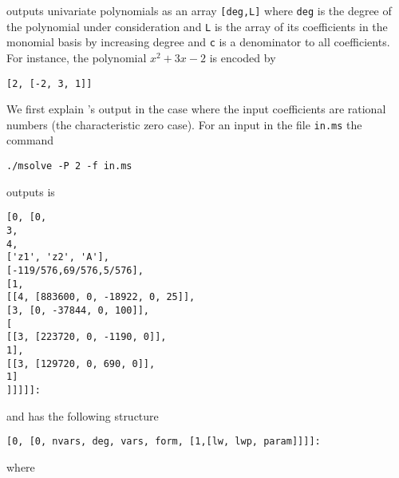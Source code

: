 \documentclass[a4paper,english,11pt]{scrartcl}
\theoremstyle{definition}
\theoremstyle{remark}
\begin{document}
\msolve outputs univariate polynomials as an array \verb+[deg,L]+ where
\verb+deg+ is the degree of the polynomial under consideration and \verb+L+ is
the array of its coefficients in the monomial basis by increasing degree and 
\verb+c+ is a denominator to all coefficients. For instance, the polynomial 
\(x^2+3x-2\) is encoded by 
\begin{verbatim}
[2, [-2, 3, 1]]
\end{verbatim}


We first explain \msolve's output in the case where the input coefficients are 
rational numbers (the characteristic zero case).
For an input in the file \verb+in.ms+
the command
\begin{tcolorbox} %
  \begin{verbatim}
./msolve -P 2 -f in.ms
  \end{verbatim}
\end{tcolorbox}
\msolve outputs is
\begin{tcolorbox} %
  \begin{lstlisting}
[0, [0, 
3, 
4, 
['z1', 'z2', 'A'],
[-119/576,69/576,5/576],
[1,
[[4, [883600, 0, -18922, 0, 25]],
[3, [0, -37844, 0, 100]],
[
[[3, [223720, 0, -1190, 0]],
1],
[[3, [129720, 0, 690, 0]],
1]
]]]]]:
  \end{lstlisting}
\end{tcolorbox}
and
has the following structure
\begin{tcolorbox}
  \begin{lstlisting}
[0, [0, nvars, deg, vars, form, [1,[lw, lwp, param]]]]:
  \end{lstlisting}
\end{tcolorbox}
where
\end{document}
